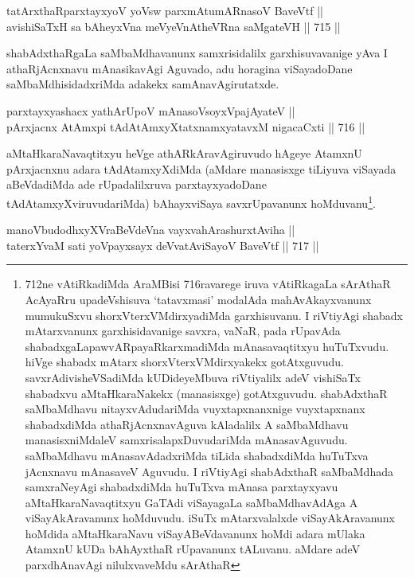 \begin{shl}
tatArxthaRparxtayxyoV yoV\s sw parxmAtumARnasoV BaveVtf || \\
avishiSaTxH sa bAheyxVna meVyeVnAtheVRna saMgateVH \hfill || 715 ||  
\end{shl}

\begin{artha} 
shabAdxthaRgaLa saMbaMdhavanunx samxrisidalilx garxhisuvavanige yAva I 
athaRjAcnxnavu mAnasikavAgi Aguvado, adu horagina viSayadoDane 
saMbaMdhisidadxriMda adakekx samAnavAgirutatxde.
\end{artha}

\begin{shl}
parxtayxyashacx yathArUpoV mAnasoV\s soyxVpajAyateV || \\
pArxjacnx AtAmx\s pi tAdAtAmxyXtatxnamxyatavxM nigacaCxti \hfill || 716 ||  
\end{shl}

\begin{artha} 
aMtaHkaraNavaqtitxyu heVge athARkAravAgiruvudo hAgeye AtamxnU 
pArxjacnxnu adara tAdAtamxyXdiMda (aMdare manasisxge tiLiyuva viSayada 
aBeVdadiMda ade rUpadalilxruva parxtayxyadoDane 
tAdAtamxyXviruvudariMda) bAhayxviSaya savxrUpavanunx 
hoMduvanu\footnote{712ne vAtiRkadiMda AraMBisi 716ravarege iruva 
vAtiRkagaLa sArAthaR \ndash  AcAyaRru upadeVshisuva `tatavxmasi' modalAda 
mahAvAkayxvanunx mumukuSxvu shorxVterxVMdirxyadiMda garxhisuvanu. I 
riVtiyAgi shabadx mAtarxvanunx garxhisidavanige savxra, vaNaR, pada 
rUpavAda shabadxgaLa\break pawvARpayaRkarxmadiMda mAnasavaqtitxyu 
huTuTxvudu. hiVge shabadx mAtarx shorxVterxVMdirxyakekx gotAtxguvudu. 
savxrAdivisheVSadiMda kUDideyeMbuva riVtiyalilx adeV vishiSaTx 
shabadxvu aMtaHkaraNakekx (manasisxge) gotAtxguvudu. shabAdxthaR 
saMbaMdhavu nitayxvAdudariMda vuyxtapxnanxnige vuyxtapxnanx 
shabadxdiMda athaRjAcnxnavAguva kAladalilx A saMbaMdhavu 
manasisxniMdaleV samxrisalapxDuvudariMda mAnasavAguvudu. saMbaMdhavu 
mAnasavAdadxriMda tiLida shabadxdiMda huTuTxva jAcnxnavu mAnasaveV 
Aguvudu. I riVtiyAgi shabAdxthaR saMbaMdhada samxraNeyAgi shabadxdiMda 
huTuTxva mAnasa parxtayxyavu aMtaHkaraNavaqtitxyu GaTAdi viSayagaLa 
saMbaMdhavAdAga A viSayAkAravanunx hoMduvudu. iSuTx mAtarxvalalxde 
viSayAkAravanunx hoMdida aMtaHkaraNavu viSayABeVdavanunx hoMdi adara 
mUlaka AtamxnU kUDa bAhAyxthaR rUpavanunx tALuvanu. aMdare adeV 
parxdhAnavAgi nilulxvaveMdu sArAthaR \ndash }.
\end{artha}

\begin{shl}
manoVbudodhxyXVraBeVdeVna vayxvahArashurxtAviha || \\
taterxYvaM sati yoVpayxsayx deVvatAviSayoV BaveVtf \hfill || 717 ||  
\end{shl}
				
